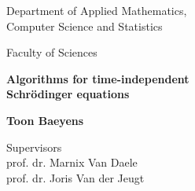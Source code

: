\begin{titlepage}


    \begin{minipage}{6cm}
        \begin{flushleft}
            Department of Applied Mathematics, \\
            Computer Science and Statistics

            \vspace{3mm}

            {Faculty of Sciences}
        \end{flushleft}
    \end{minipage}

    \vspace{4cm}

    \begin{center}
        {\selectfont
        \textbf{ Algorithms for time-independent\\Schrödinger equations}
        }


        \vspace{5mm}

        \textbf{ Toon Baeyens}

    \end{center}

    \vspace{1cm}

    \begin{flushleft}
        Supervisors \\
        prof. dr. Marnix Van Daele\\
        prof. dr. Joris Van der Jeugt
    \end{flushleft}


\end{titlepage}

